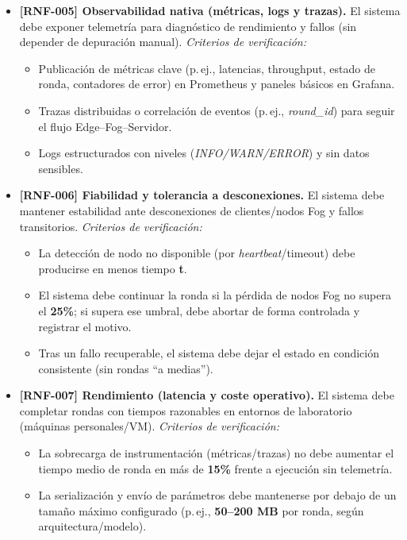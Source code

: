 \documentclass{report}
\begin{document}
\begin{itemize}
  \item \textbf{[RNF-005] Observabilidad nativa (métricas, logs y trazas).}  
  El sistema debe exponer telemetría para diagnóstico de rendimiento y fallos (sin depender de depuración manual).
  \textit{Criterios de verificación:}
  \begin{itemize}
    \item Publicación de métricas clave (p.\,ej., latencias, throughput, estado de ronda, contadores de error) en Prometheus y paneles básicos en Grafana.
    \item Trazas distribuidas o correlación de eventos (p.\,ej., \textit{round\_id}) para seguir el flujo Edge--Fog--Servidor.
    \item Logs estructurados con niveles (\textit{INFO/WARN/ERROR}) y sin datos sensibles.
  \end{itemize}

  \item \textbf{[RNF-006] Fiabilidad y tolerancia a desconexiones.}  
  El sistema debe mantener estabilidad ante desconexiones de clientes/nodos Fog y fallos transitorios.
  \textit{Criterios de verificación:}
  \begin{itemize}
    \item La detección de nodo no disponible (por \textit{heartbeat}/timeout) debe producirse en menos tiempo \textbf{t}.
    \item El sistema debe continuar la ronda si la pérdida de nodos Fog no supera el \textbf{25\%}; si supera ese umbral, debe abortar de forma controlada y registrar el motivo.
    \item Tras un fallo recuperable, el sistema debe dejar el estado en condición consistente (sin rondas ``a medias'').
  \end{itemize}

  \item \textbf{[RNF-007] Rendimiento (latencia y coste operativo).}  
  El sistema debe completar rondas con tiempos razonables en entornos de laboratorio (máquinas personales/VM).
  \textit{Criterios de verificación:}
  \begin{itemize}
    \item La sobrecarga de instrumentación (métricas/trazas) no debe aumentar el tiempo medio de ronda en más de \textbf{15\%} frente a ejecución sin telemetría.
    \item La serialización y envío de parámetros debe mantenerse por debajo de un tamaño máximo configurado (p.\,ej., \textbf{50--200 MB} por ronda, según arquitectura/modelo).
  \end{itemize}


\end{itemize}
\end{document}
